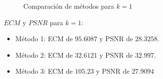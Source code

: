 \begin{figure}[H]
    \centering
    \qquad
    \qquad
    \caption{Comparación de métodos para $k = 1$}%
    \label{fig:example}%
\end{figure}

$ECM$ y $PSNR$ para $k = 1$:

\begin{itemize}
 \item Método 1: ECM de $95.6087$ y PSNR de $28.3258$.
 \item Método 2: ECM de $32.6121$ y PSNR de $32.997$.
 \item Método 3: ECM de $105.23$ y PSNR de $27.9094$
\end{itemize}

